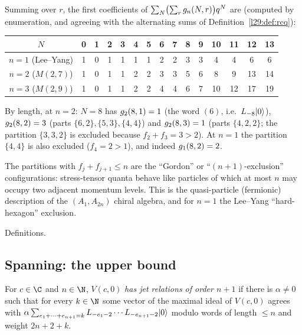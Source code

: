 \begin{example}[The counts for $n=1,2,3$]\label{l29:ex:gordon}
Summing over $r$, the first coefficients of $\sum_N\bigl(\sum_rg_n(N,r)\bigr)q^N$ are (computed by
enumeration, and agreeing with the alternating sums of Definition~\ref{l29:def:rcq}):
\begin{center}\small
\begin{tabular}{c|cccccccccccccc}
$N$ & 0&1&2&3&4&5&6&7&8&9&10&11&12&13\\ \hline
$n=1$ (Lee--Yang) & 1&0&1&1&1&1&2&2&3&3&4&4&6&6\\
$n=2$ ($M(2,7)$) & 1&0&1&1&2&2&3&3&5&6&8&9&13&14\\
$n=3$ ($M(2,9)$) & 1&0&1&1&2&2&4&4&6&7&10&12&17&19\\
\end{tabular}
\end{center}
By length, at $n=2$: $N=8$ has $g_2(8,1)=1$ (the word $(6)$, i.e.\ $L_{-8}|0\rangle$),
$g_2(8,2)=3$ (parts $\{6,2\},\{5,3\},\{4,4\}$) and $g_2(8,3)=1$ (parts $\{4,2,2\}$; the
partition $\{3,3,2\}$ is excluded because $f_2+f_3=3>2$). At $n=1$ the partition $\{4,4\}$ is also excluded
($f_4=2>1$), and indeed $g_1(8,2)=2$.
\end{example}

\begin{physics}
The partitions with $f_j+f_{j+1}\le n$ are the ``Gordon'' or ``$(n+1)$-exclusion'' configurations: stress-tensor
quanta behave like particles of which at most $n$ may occupy two adjacent momentum levels. This is the quasi-particle
(fermionic) description of the $(A_1,A_{2n})$ chiral algebra, and for $n=1$ the Lee--Yang ``hard-hexagon'' exclusion.
\end{physics}

\begin{status}
Definitions.
\end{status}

\subsection{Spanning: the upper bound}

\begin{definition}\label{l29:def:jetrel}
For $c\in\C$ and $n\in\N$, $V(c,0)$ \emph{has jet relations of order $n+1$} if there is $\alpha\ne0$ such that for every
$k\in\N$ some vector of the maximal ideal of $V(c,0)$ agrees with $\alpha\sum_{e_1+\cdots+e_{n+1}=k}
L_{-e_1-2}\cdots L_{-e_{n+1}-2}|0\rangle$ modulo words of length $\le n$ and weight $2n+2+k$.
\end{definition}

